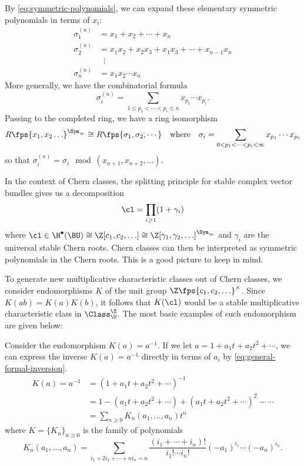 By \cref{eq:symmetric-polynomials}, we can expand these elementary symmetric polynomials in terms of $x_i$:
\[
	\begin{aligned}
		\sigma_1^{(n)} & = x_1+x_2+\cdots + x_n                          \\
		\sigma_2^{(n)} & = x_1x_2 + x_2x_3 + x_1x_3 +\cdots + x_{n-1}x_n \\
		               & \;\;\vdots                                      \\
		\sigma_n^{(n)} & = x_1x_2\cdots x_n
	\end{aligned}
\]
More generally, we have the combinatorial formula
\[
	\sigma_i^{(n)} = \sum_{1\leq p_1<\cdots <p_i\leq n} x_{p_1}\cdots x_{p_i}.
\]
Passing to the completed ring, we have a ring isomorphism
\[
	R\fps{x_1,x_2\ldots}^{\Sym_\infty} \cong R\fps{\sigma_1,\sigma_2,\cdots}\quad\textrm{where}\quad \sigma_i = \sum_{0<p_1<\cdots < p_i<\infty}x_{p_1}\cdots x_{p_i}
\]
so that $\sigma_i^{(n)} = \sigma_i \mod (x_{n+1},x_{n+2},\ldots)$. 

\begin{remark}
In the context of Chern classes, the splitting principle for stable complex vector bundles gives us a decomposition
\[
	\cl = \prod_{i\geq 1}(1+\gamma_i)
\]
where $\cl\in \H^\bullet(\BU) \cong \Z[c_1,c_2,\ldots]\cong \Z[\gamma_1,\gamma_2,\ldots]^{\Sym_\infty}$ and $\gamma_i$ are the universal stable Chern roots. Chern classes can then be interpreted as symmetric polynomials in the Chern roots. This is a good picture to keep in mind.
\end{remark}

To generate new multiplicative characteristic classes out of Chern classes, we consider endomorphisms $K$ of the unit group $\Z\fps{c_1,c_2,\ldots}^\times$. Since $K(ab)=K(a)K(b)$, it follows that $K(\cl)$ would be a stable multiplicative characteristic class in $\Class^\Z_{\U}$. The most basic examples of such endomorphism are given below:

\begin{example}
Consider the endomorphism $K(a)=a^{-1}$.
If we let $a=1+a_1t+a_2t^2+\cdots$, we can express the inverse $K(a)=a^{-1}$ directly in terms of $a_i$ by \cref{eq:general-formal-inversion}. 
\begin{equation}\label{eq:chern-inverse-non-symmetric}
	\begin{aligned}
		K(a)=a^{-1} & = (1+a_1t+a_2t^2+\cdots)^{-1}                              \\
		            & = 1-(a_1t+a_2t^2+\cdots) + (a_1t+a_2t^2+\cdots)^2 - \cdots \\
		            & = \sum_{n\geq 0} K_n(a_1,\ldots, a_n)t^n
	\end{aligned}
\end{equation}
where $K=\{K_n\}_{n\geq 0}$ is the family of polynomials
\begin{equation}\label{eq:inverse-K-series}
	K_n(a_1,\ldots, a_n) = \sum_{i_1+2i_2+\cdots+ ni_n=n}\frac{(i_1+\cdots+i_n)!}{i_1!\cdots i_n!}(-a_1)^{i_1}\cdots(-a_n)^{i_n}.
\end{equation}
\end{example}

